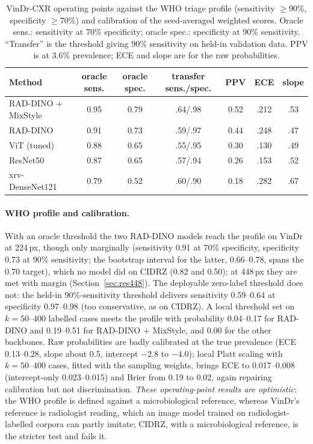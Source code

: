 \documentclass[10pt,a4paper]{article}
\begin{document}
\begin{table}[H]\centering\footnotesize\setlength{\tabcolsep}{3.6pt}
\begin{tabular}{lcccccc}\toprule
Method & oracle sens. & oracle spec. & transfer sens./spec. & PPV & ECE & slope\\\midrule
RAD-DINO + MixStyle & 0.95 & 0.79 & .64/.98 & 0.52 & .212 & .53\\
RAD-DINO & 0.91 & 0.73 & .59/.97 & 0.44 & .248 & .47\\
ViT (tuned) & 0.88 & 0.65 & .55/.95 & 0.30 & .130 & .49\\
ResNet50 & 0.87 & 0.65 & .57/.94 & 0.26 & .153 & .52\\
xrv-DenseNet121 & 0.79 & 0.52 & .60/.90 & 0.18 & .282 & .67\\\bottomrule
\end{tabular}\caption{VinDr-CXR operating points against the WHO triage profile (sensitivity $\ge$90\%, specificity $\ge$70\%) and calibration of the seed-averaged weighted scores. Oracle sens.: sensitivity at 70\% specificity; oracle spec.: specificity at 90\% sensitivity. ``Transfer'' is the threshold giving 90\% sensitivity on held-in validation data. PPV is at 3.6\% prevalence; ECE and slope are for the raw probabilities.}\label{tab:vindrwho}\end{table}
\paragraph{WHO profile and calibration.} With an oracle threshold the two RAD-DINO models reach the profile on VinDr at 224\,px, though only marginally (sensitivity 0.91 at 70\% specificity, specificity 0.73 at 90\% sensitivity; the bootstrap interval for the latter, 0.66--0.78, spans the 0.70 target), which no model did on CIDRZ (0.82 and 0.50); at 448\,px they are met with margin (Section~\ref{sec:res448}). The deployable zero-label threshold does not: the held-in 90\%-sensitivity threshold delivers sensitivity 0.59--0.64 at specificity 0.97--0.98 (too conservative, as on CIDRZ). A local threshold set on $k=50$--$400$ labelled cases meets the profile with probability 0.04--0.17 for RAD-DINO and 0.19--0.51 for RAD-DINO + MixStyle, and 0.00 for the other backbones. Raw probabilities are badly calibrated at the true prevalence (ECE 0.13--0.28, slope about 0.5, intercept $-2.8$ to $-4.0$); local Platt scaling with $k=50$--$400$ cases, fitted with the sampling weights, brings ECE to 0.017--0.008 (intercept-only 0.023--0.015) and Brier from 0.19 to 0.02, again repairing calibration but not discrimination. \emph{These operating-point results are optimistic}: the WHO profile is defined against a microbiological reference, whereas VinDr's reference is radiologist reading, which an image model trained on radiologist-labelled corpora can partly imitate; CIDRZ, with a microbiological reference, is the stricter test and fails it.
\end{document}
